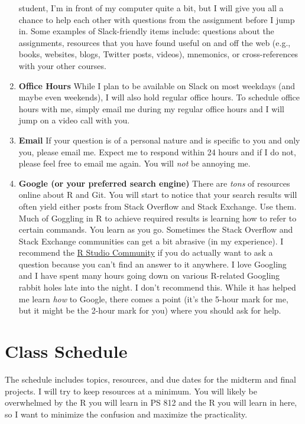 \documentclass[11pt,]{article}
\begin{document}
\begin{enumerate}
  student, I'm in front of my computer quite a bit, but I will give you
  all a chance to help each other with questions from the assignment
  before I jump in. Some examples of Slack-friendly items include:
  questions about the assignments, resources that you have found useful
  on and off the web (e.g., books, websites, blogs, Twitter posts,
  videos), mnemonics, or cross-references with your other courses.
\item
  \textbf{Office Hours} While I plan to be available on Slack on most
  weekdays (and maybe even weekends), I will also hold regular office
  hours. To schedule office hours with me, simply email me during my
  regular office hours and I will jump on a video call with you.
\item
  \textbf{Email} If your question is of a personal nature and is
  specific to you and only you, please email me. Expect me to respond
  within 24 hours and if I do not, please feel free to email me again.
  You will \emph{not} be annoying me.
\item
  \textbf{Google (or your preferred search engine)} There are
  \emph{tons} of resources online about R and Git. You will start to
  notice that your search results will often yield either posts from
  Stack Overflow and Stack Exchange. Use them. Much of Goggling in R to
  achieve required results is learning how to refer to certain commands.
  You learn as you go. Sometimes the Stack Overflow and Stack Exchange
  communities can get a bit abrasive (in my experience). I recommend the
  \href{https://community.rstudio.com/}{R Studio Community} if you do
  actually want to ask a question because you can't find an answer to it
  anywhere. I love Googling and I have spent many hours going down on
  various R-related Googling rabbit holes late into the night. I don't
  recommend this. While it has helped me learn \emph{how} to Google,
  there comes a point (it's the 5-hour mark for me, but it might be the
  2-hour mark for you) where you should ask for help.
\end{enumerate}

\hypertarget{class-schedule}{%
\section{Class Schedule}\label{class-schedule}}

The schedule includes topics, resources, and due dates for the midterm
and final projects. I will try to keep resources at a minimum. You will
likely be overwhelmed by the R you will learn in PS 812 and the R you
will learn in here, so I want to minimize the confusion and maximize the
practicality.
\end{document}
